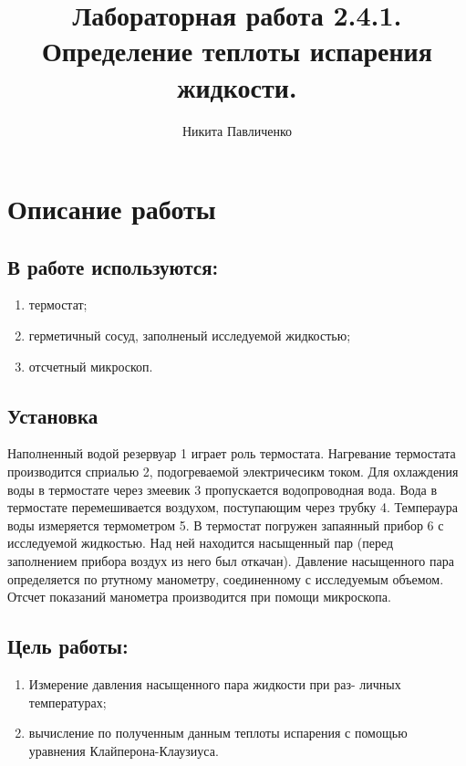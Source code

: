 \documentclass[12pt]{article}
\title{Лабораторная работа 2.4.1. Определение теплоты испарения жидкости.}
\author{Никита Павличенко}
\begin{document}
\maketitle
{}%
\thispagestyle{fancy}
\newpage
\section{Описание работы}
\subsection{В работе используются:}
\begin{enumerate}
	\item термостат;
	\item герметичный сосуд, заполненый исследуемой жидкостью;
	\item отсчетный микроскоп.
\end{enumerate}


\subsection{Установка}
Наполненный водой резервуар 1 играет роль термостата. Нагревание термостата производится сприалью 2, подогреваемой электричесикм током. Для охлаждения воды в термостате через змеевик 3 пропускается водопроводная вода. Вода в термостате перемешивается воздухом, поступающим через трубку 4. Темпераура воды измеряется термометром 5. В термостат погружен запаянный прибор 6 с исследуемой жидкостью. Над ней находится насыщенный пар (перед заполнением прибора воздух из него был откачан). Давление насыщенного пара определяется по ртутному манометру, соединенному с исследуемым объемом. Отсчет показаний манометра производится при помощи микроскопа.


\subsection{Цель работы:}
\begin{enumerate}
\item Измерение давления насыщенного пара жидкости при раз- личных температурах;
\item вычисление по  полученным  данным теплоты испарения  с помощью уравнения Клайперона-Клаузиуса.
\end{enumerate}
\end{document}
